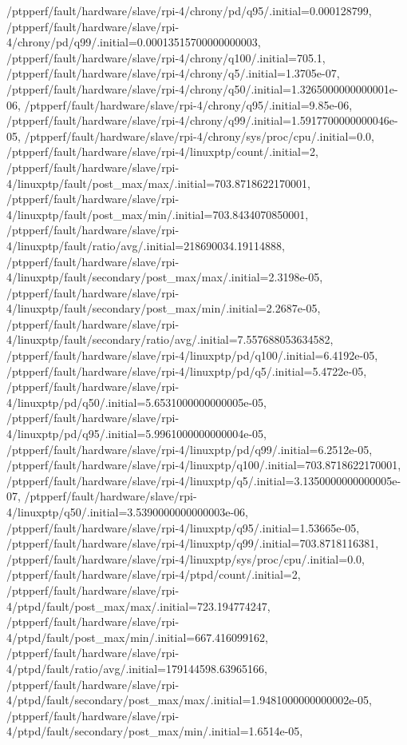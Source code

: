 {    /ptpperf/fault/hardware/slave/rpi-4/chrony/pd/q95/.initial=0.000128799,
    /ptpperf/fault/hardware/slave/rpi-4/chrony/pd/q99/.initial=0.00013515700000000003,
    /ptpperf/fault/hardware/slave/rpi-4/chrony/q100/.initial=705.1,
    /ptpperf/fault/hardware/slave/rpi-4/chrony/q5/.initial=1.3705e-07,
    /ptpperf/fault/hardware/slave/rpi-4/chrony/q50/.initial=1.3265000000000001e-06,
    /ptpperf/fault/hardware/slave/rpi-4/chrony/q95/.initial=9.85e-06,
    /ptpperf/fault/hardware/slave/rpi-4/chrony/q99/.initial=1.5917700000000046e-05,
    /ptpperf/fault/hardware/slave/rpi-4/chrony/sys/proc/cpu/.initial=0.0,
    /ptpperf/fault/hardware/slave/rpi-4/linuxptp/count/.initial=2,
    /ptpperf/fault/hardware/slave/rpi-4/linuxptp/fault/post_max/max/.initial=703.8718622170001,
    /ptpperf/fault/hardware/slave/rpi-4/linuxptp/fault/post_max/min/.initial=703.8434070850001,
    /ptpperf/fault/hardware/slave/rpi-4/linuxptp/fault/ratio/avg/.initial=218690034.19114888,
    /ptpperf/fault/hardware/slave/rpi-4/linuxptp/fault/secondary/post_max/max/.initial=2.3198e-05,
    /ptpperf/fault/hardware/slave/rpi-4/linuxptp/fault/secondary/post_max/min/.initial=2.2687e-05,
    /ptpperf/fault/hardware/slave/rpi-4/linuxptp/fault/secondary/ratio/avg/.initial=7.557688053634582,
    /ptpperf/fault/hardware/slave/rpi-4/linuxptp/pd/q100/.initial=6.4192e-05,
    /ptpperf/fault/hardware/slave/rpi-4/linuxptp/pd/q5/.initial=5.4722e-05,
    /ptpperf/fault/hardware/slave/rpi-4/linuxptp/pd/q50/.initial=5.6531000000000005e-05,
    /ptpperf/fault/hardware/slave/rpi-4/linuxptp/pd/q95/.initial=5.9961000000000004e-05,
    /ptpperf/fault/hardware/slave/rpi-4/linuxptp/pd/q99/.initial=6.2512e-05,
    /ptpperf/fault/hardware/slave/rpi-4/linuxptp/q100/.initial=703.8718622170001,
    /ptpperf/fault/hardware/slave/rpi-4/linuxptp/q5/.initial=3.1350000000000005e-07,
    /ptpperf/fault/hardware/slave/rpi-4/linuxptp/q50/.initial=3.5390000000000003e-06,
    /ptpperf/fault/hardware/slave/rpi-4/linuxptp/q95/.initial=1.53665e-05,
    /ptpperf/fault/hardware/slave/rpi-4/linuxptp/q99/.initial=703.8718116381,
    /ptpperf/fault/hardware/slave/rpi-4/linuxptp/sys/proc/cpu/.initial=0.0,
    /ptpperf/fault/hardware/slave/rpi-4/ptpd/count/.initial=2,
    /ptpperf/fault/hardware/slave/rpi-4/ptpd/fault/post_max/max/.initial=723.194774247,
    /ptpperf/fault/hardware/slave/rpi-4/ptpd/fault/post_max/min/.initial=667.416099162,
    /ptpperf/fault/hardware/slave/rpi-4/ptpd/fault/ratio/avg/.initial=179144598.63965166,
    /ptpperf/fault/hardware/slave/rpi-4/ptpd/fault/secondary/post_max/max/.initial=1.9481000000000002e-05,
    /ptpperf/fault/hardware/slave/rpi-4/ptpd/fault/secondary/post_max/min/.initial=1.6514e-05,
}
